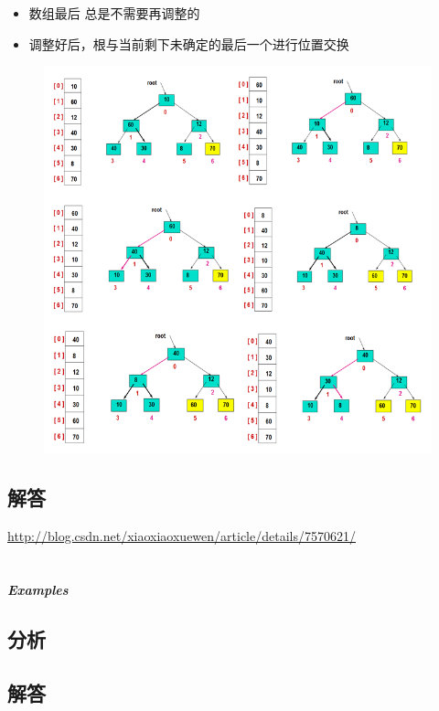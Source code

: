\documentclass[UTF8,a4paper,12pt]{ctexbook}
\begin{document}
		\begin{itemize}
			\item  数组最后 总是不需要再调整的
			\item  调整好后，根与当前剩下未确定的最后一个进行位置交换
		\end{itemize}
	
		\begin{figure}[h]
			\centering
			\includegraphics*[scale = 0.7]{Heap.png}
		\end{figure}
	\subsection{解答}
	
	\url{http://blog.csdn.net/xiaoxiaoxuewen/article/details/7570621/}
	
\section{}
	
	\subparagraph{Examples}
	
	\subsection{分析}
	
	\subsection{解答}
	
\end{document}
